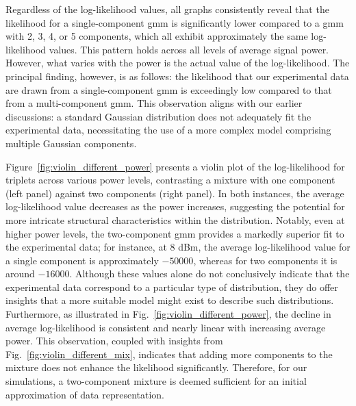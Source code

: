 Regardless of the log-likelihood values, all graphs consistently reveal that the likelihood for a single-component \gls{gmm} is significantly lower compared to a \gls{gmm} with 2, 3, 4, or 5 components, which all exhibit approximately the same log-likelihood values. This pattern holds across all levels of average signal power. However, what varies with the power is the actual value of the log-likelihood. The principal finding, however, is as follows: the likelihood that our experimental data are drawn from a single-component \gls{gmm} is exceedingly low compared to that from a multi-component \gls{gmm}. This observation aligns with our earlier discussions: a standard Gaussian distribution does not adequately fit the experimental data, necessitating the use of a more complex model comprising multiple Gaussian components.



Figure~\ref{fig:violin_different_power} presents a violin plot of the log-likelihood for triplets across various power levels, contrasting a mixture with one component (left panel) against two components (right panel). In both instances, the average log-likelihood value decreases as the power increases, suggesting the potential for more intricate structural characteristics within the distribution. Notably, even at higher power levels, the two-component \gls{gmm} provides a markedly superior fit to the experimental data; for instance, at 8 dBm, the average log-likelihood value for a single component is approximately \(-50000\), whereas for two components it is around \(-16000\). Although these values alone do not conclusively indicate that the experimental data correspond to a particular type of distribution, they do offer insights that a more suitable model might exist to describe such distributions. Furthermore, as illustrated in Fig.~\ref{fig:violin_different_power}, the decline in average log-likelihood is consistent and nearly linear with increasing average power. This observation, coupled with insights from Fig.~\ref{fig:violin_different_mix}, indicates that adding more components to the mixture does not enhance the likelihood significantly. Therefore, for our simulations, a two-component mixture is deemed sufficient for an initial approximation of data representation.



